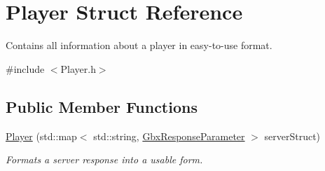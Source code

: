 \hypertarget{structPlayer}{\section{Player Struct Reference}
\label{structPlayer}
}


Contains all information about a player in easy-\/to-\/use format.  




{\ttfamily \#include $<$Player.\-h$>$}

\subsection*{Public Member Functions}
\begin{DoxyCompactItemize}
\item 
\hyperlink{structPlayer_adf15eb006b535a4e1b72b419021f1f11}{Player} (std\-::map$<$ std\-::string, \hyperlink{classGbxResponseParameter}{Gbx\-Response\-Parameter} $>$ server\-Struct)
\begin{DoxyCompactList}\small\item\em Formats a server response into a usable form. \end{DoxyCompactList}\end{DoxyCompactItemize}
